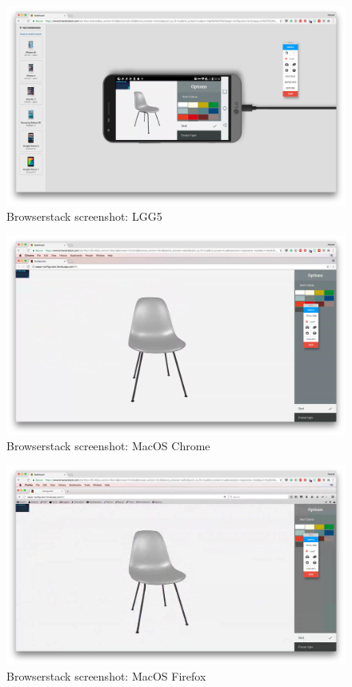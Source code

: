 \begin{figure}
\includegraphics[width=15cm]{images/deviceScreenshots/LGG5}
\caption{Browserstack screenshot: LGG5}
\label{attachment:LGG5}
\end{figure}

\clearpage

\begin{figure}
\includegraphics[width=15cm]{images/deviceScreenshots/MacOSChrome}
\caption{Browserstack screenshot: MacOS Chrome}
\label{attachment:MacOSChrome}
\end{figure}

\begin{figure}
\includegraphics[width=15cm]{images/deviceScreenshots/MacOSFirefox}
\caption{Browserstack screenshot: MacOS Firefox}
\label{attachment:MacOSFirefox}
\end{figure}

